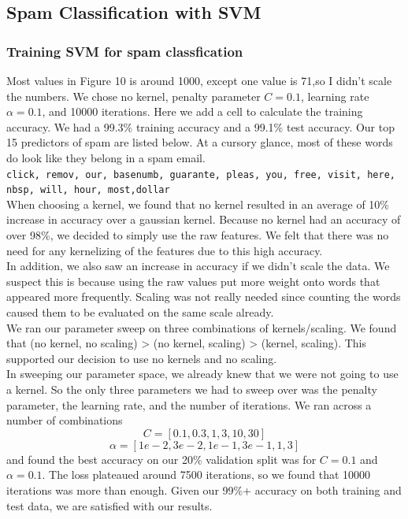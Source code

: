\documentclass[pdftex,11pt]{article}
\begin{document}
\subsection{Spam Classification with SVM}
\subsubsection{Training SVM for spam classfication}
Most values in Figure 10 is around 1000, except one value is 71,so I didn't scale the numbers. We chose no kernel, penalty parameter $C=0.1$, learning rate $\alpha=0.1$, and 10000 iterations. Here we add a cell to calculate the training accuracy. We had a 99.3\% training accuracy and a 99.1\% test accuracy. Our top 15 predictors of spam are listed below. At a cursory glance, most of these words do look like they belong in a spam email.\\
{\tt click, remov, our, basenumb, guarante, pleas, you, free, visit, here, nbsp,  will, hour,  most,dollar}\\
When choosing a kernel, we found that no kernel resulted in an average of 10\% increase in accuracy over a gaussian kernel. Because no kernel had an accuracy of over 98\%, we decided to simply use the raw features. We felt that there was no need for any kernelizing of the features due to this high accuracy.\\
In addition, we also saw an increase in accuracy if we didn't scale the data. We suspect this is because using the raw values put more weight onto words that appeared more frequently. Scaling was not really needed since counting the words caused them to be evaluated on the same scale already.\\
We ran our parameter sweep on three combinations of kernels/scaling. We found that (no kernel, no scaling) > (no kernel, scaling) > (kernel, scaling). This supported our decision to use no kernels and no scaling.\\
In sweeping our parameter space, we already knew that we were not going to use a kernel. So the only three parameters we had to sweep over was the penalty parameter, the learning rate, and the number of iterations. We ran across a number of combinations
$$C = [0.1, 0.3, 1, 3, 10, 30]$$
$$\alpha = [1e-2, 3e-2, 1e-1, 3e-1, 1, 3]$$
and found the best accuracy on our 20\% validation split was for $C=0.1$ and $\alpha=0.1$. The loss plateaued around 7500 iterations, so we found that 10000 iterations was more than enough. Given our 99\%+ accuracy on both training and test data, we are satisfied with our results.
\end{document}
